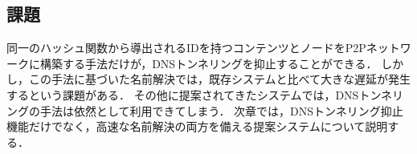 \subsection{課題}
\label{sec:issue-past-works}
同一のハッシュ関数から導出されるIDを持つコンテンツとノードをP2Pネットワークに構築する手法だけが，DNSトンネリングを抑止することができる．
しかし，この手法に基づいた名前解決では，既存システムと比べて大きな遅延が発生するという課題がある．
その他に提案されてきたシステムでは，DNSトンネリングの手法は依然として利用できてしまう．
次章では，DNSトンネリング抑止機能だけでなく，高速な名前解決の両方を備える提案システムについて説明する．

